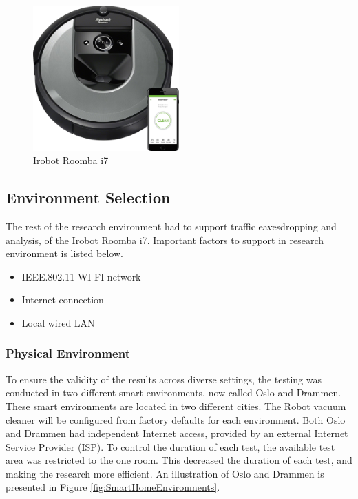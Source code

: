 \begin{figure}[H]
    \centering
    \includegraphics[width=0.5\textwidth]{figures/Irobot_picture.png}
    \caption{Irobot Roomba i7 \cite{irobotroombai7_picture}}
    \label{fig:WLAN_LAN_setup}
\end{figure}

\subsection{Environment Selection}
The rest of the research environment had to support traffic eavesdropping and analysis, of the Irobot Roomba i7. Important factors to support in research environment is listed below.

\begin{itemize}
    \item IEEE.802.11 WI-FI network
    \item Internet connection
    \item Local wired LAN
\end{itemize}

\subsubsection{Physical Environment}
To ensure the validity of the results across diverse settings, the testing was conducted in two different smart environments, now called Oslo and Drammen. These smart environments are located in two different cities. The Robot vacuum cleaner will be configured from factory defaults for each environment. Both Oslo and Drammen had independent Internet access, provided by an external Internet Service Provider (ISP). To control the duration of each test, the available test area was restricted to the one room. This decreased the duration of each test, and making the research more efficient. An illustration of Oslo and Drammen is presented in Figure \ref{fig:SmartHomeEnvironments}.

